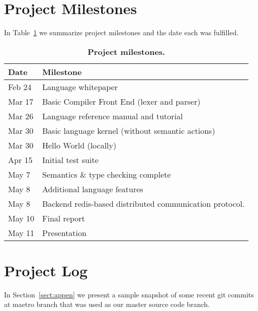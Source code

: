 \section{Project Milestones}
In Table~\ref{tab:milestones}  we summarize project milestones and the date
each was fulfilled.

\begin{table}[!h]
{%
 \begin{center}
    \begin{tabular}{ | l || l |}
    \hline
    \textbf{Date} & \textbf{Milestone}\\
    \hline
    \hline
    Feb 24 &  Language whitepaper\\ \hline
    Mar 17 &  Basic Compiler Front End (lexer and parser)\\ \hline
    Mar 26 &  Language reference manual and tutorial\\ \hline
    Mar 30 &  Basic language kernel (without semantic actions)\\ \hline
    Mar 30 &  Hello World (locally)\\ \hline
    Apr 15 &  Initial test suite \\ \hline
    May 7 &  Semantics \& type checking complete \\ \hline
    May 8 &  Additional language features \\ \hline
    May 8 &  Backend redis-based distributed communication protocol.\\ \hline
    May 10 &  Final report\\ \hline
    May 11 &  Presentation\\ \hline
    \end{tabular}
    \caption{\textbf{Project milestones.}}
    \label{tab:milestones}
 \end{center}
}
\end{table}


\section{Project Log}
In Section~\ref{sect:appen} we present a sample snapshot of some recent git
commits at maetro branch that was used as our master source code branch.
